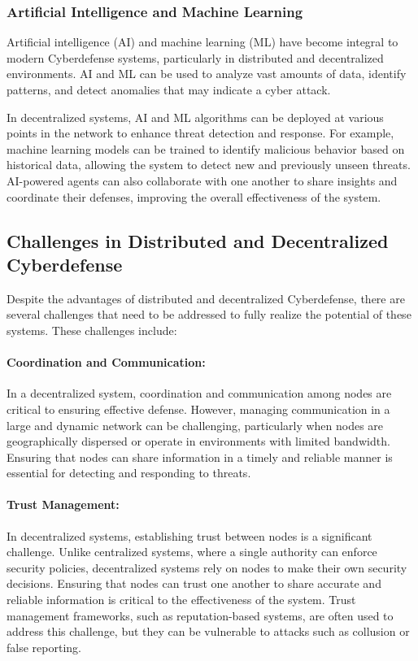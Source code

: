 \subsubsection{Artificial Intelligence and Machine Learning}

Artificial intelligence (AI) and machine learning (ML) have become integral to modern Cyberdefense systems, particularly in distributed and decentralized environments. AI and ML can be used to analyze vast amounts of data, identify patterns, and detect anomalies that may indicate a cyber attack.

In decentralized systems, AI and ML algorithms can be deployed at various points in the network to enhance threat detection and response. For example, machine learning models can be trained to identify malicious behavior based on historical data, allowing the system to detect new and previously unseen threats. AI-powered agents can also collaborate with one another to share insights and coordinate their defenses, improving the overall effectiveness of the system.

\subsection{Challenges in Distributed and Decentralized Cyberdefense}

Despite the advantages of distributed and decentralized Cyberdefense, there are several challenges that need to be addressed to fully realize the potential of these systems. These challenges include:

\paragraph{Coordination and Communication:}
In a decentralized system, coordination and communication among nodes are critical to ensuring effective defense. However, managing communication in a large and dynamic network can be challenging, particularly when nodes are geographically dispersed or operate in environments with limited bandwidth. Ensuring that nodes can share information in a timely and reliable manner is essential for detecting and responding to threats.

\paragraph{Trust Management:}
In decentralized systems, establishing trust between nodes is a significant challenge. Unlike centralized systems, where a single authority can enforce security policies, decentralized systems rely on nodes to make their own security decisions. Ensuring that nodes can trust one another to share accurate and reliable information is critical to the effectiveness of the system. Trust management frameworks, such as reputation-based systems, are often used to address this challenge, but they can be vulnerable to attacks such as collusion or false reporting.

